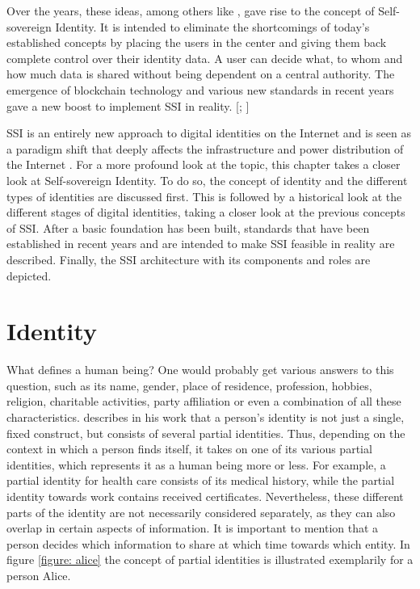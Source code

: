 Over the years, these ideas, among others like \cite{marlinspike_what_2012, idcubedorg_windhover_2014, allen_path_2016}, gave rise to the concept of Self-sovereign Identity. It is intended to eliminate the shortcomings of today's established concepts by placing the users in the center and giving them back complete control over their identity data. A user can decide what, to whom and how much data is shared without being dependent on a central authority. The emergence of blockchain technology and various new standards in recent years gave a new boost to implement \ac{SSI} in reality. [\citealp[pp. 6-7]{struker_grundlagen_2021}; \citealp[pp. 8-9]{tobin_inevitable_2017}]

\ac{SSI} is an entirely new approach to digital identities on the Internet and is seen as a paradigm shift that deeply affects the infrastructure and power distribution of the Internet \cite[p. 3]{preukschat_self-sovereign_2021}. For a more profound look at the topic, this chapter takes a closer look at Self-sovereign Identity. To do so, the concept of identity and the different types of identities are discussed first. This is followed by a historical look at the different stages of digital identities, taking a closer look at the previous concepts of \ac{SSI}. After a basic foundation has been built, standards that have been established in recent years and are intended to make \ac{SSI} feasible in reality are described. Finally, the \ac{SSI} architecture with its components and roles are depicted.


    \section{Identity}\label{section: identity}

    What defines a human being? One would probably get various answers to this question, such as its name, gender, place of residence, profession, hobbies, religion, charitable activities, party affiliation or even a combination of all these characteristics. \cite[p. 206]{claus_identity_2001} describes in his work that a person's identity is not just a single, fixed construct, but consists of several partial identities. Thus, depending on the context in which a person finds itself, it takes on one of its various partial identities, which represents it as a human being more or less. For example, a partial identity for health care consists of its medical history, while the partial identity towards work contains received certificates. Nevertheless, these different parts of the identity are not necessarily considered separately, as they can also overlap in certain aspects of information. It is important to mention that a person decides which information to share at which time towards which entity. In figure \ref{figure: alice} the concept of partial identities is illustrated exemplarily for a person Alice.

